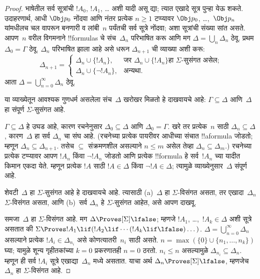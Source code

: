 \documentclass[../../../include/open-logic-section]{subfiles}
\begin{document}
\begin{proof}
भाषेतील सर्व सूत्रांची $!A_0$, $!A_1$, \dots{} अशी यादी असू द्या;
त्यात एखादे सूत्र पुन्हा येऊ शकते. उदाहरणार्थ, आधी
$\Obj p_0$ नोंदवा आणि नंतर प्रत्येक $n \ge 1$ टप्प्यावर
$\Obj p_0$, \dots,~$\Obj p_n$ यांमधीलच चल वापरून
बनणारी व लांबी~$n$ पर्यंतची सर्व सूत्रे नोंदवा;
अशा सूत्रांची संख्या सांत असते. आपण~$n$ वरील विगमनाने
!!{formula}s चे संच~$\Delta_n$ परिभाषित करू आणि मग
$\Delta = \bigcup_n \Delta_n$ ठेवू. प्रथम $\Delta_0 = \Gamma$
ठेवू. $\Delta_n$ परिभाषित झाला आहे असे धरून
$\Delta_{n+1}$ ची व्याख्या अशी करू:
\[
\Delta_{n+1} =
\begin{cases}
  \Delta_n \cup \{!A_n\}, & \text{जर $\Delta_n \cup \{ !A_n\}$
    हा $\Sigma$-सुसंगत असेल;} \\
  \Delta_n \cup \{ \lnot !A_n\}, & \text{अन्यथा.}
\end{cases}
\]
आता $\Delta = \bigcup_{n=0}^\infty \Delta_n$ ठेवू.

या व्याख्येतून आवश्यक गुणधर्म असलेला संच~$\Delta$
खरोखर मिळतो हे दाखवायचे आहे: $\Gamma \subseteq \Delta$
आणि~$\Delta$ हा संपूर्ण $\Sigma$-सुसंगत आहे.

$\Gamma \subseteq \Delta$ हे उघड आहे, कारण रचनेनुसार
$\Delta_0 \subseteq \Delta$ आणि $\Delta_0 = \Gamma$.
खरे तर प्रत्येक~$n$ साठी $\Delta_n \subseteq \Delta$,
कारण~$\Delta$ हा सर्व $\Delta_n$ चा संघ आहे. (रचनेच्या
प्रत्येक पायरीवर आधीच्या संचात !!a{formula} जोडतो; म्हणून
$\Delta_n \subseteq \Delta_{n+1}$. तसेच
$\subseteq$ संक्रमणशील असल्याने $n \le m$ असेल तेव्हा
$\Delta_n \subseteq \Delta_{m}$.) रचनेच्या प्रत्येक
टप्प्यावर आपण $!A_n$ किंवा $\lnot !A_n$ जोडतो आणि
प्रत्येक !!{formula} हे सर्व~$!A_n$ च्या यादीत किमान
एकदा येते. म्हणून प्रत्येक $!A$ साठी $!A
\in \Delta$ किंवा $\lnot !A \in \Delta$;
त्यामुळे व्याख्येनुसार~$\Delta$ संपूर्ण आहे.

शेवटी~$\Delta$ हा $\Sigma$-सुसंगत आहे हे दाखवायचे आहे.
त्यासाठी (a)~$\Delta$ हा $\Sigma$-विसंगत असता, तर
एखादा~$\Delta_n$ $\Sigma$-विसंगत असता, आणि
(b)~सर्व $\Delta_n$ हे $\Sigma$-सुसंगत आहेत,
असे आपण दाखवू.

समजा~$\Delta$ हा $\Sigma$-विसंगत आहे. मग
$\Delta \Proves[\Sigma] \lfalse$; म्हणजे
$!A_1$, \dots,~$!A_k \in \Delta$ अशी सूत्रे असतात की
$\Sigma \Proves !A_1 \lif (!A_2 \lif \cdots (!A_k
\lif \lfalse)\dots)$. $\Delta = \bigcup_{n=0}^\infty \Delta_n$
असल्याने प्रत्येक $!A_i \in \Delta_{n_i}$ असे कोणत्यातरी~$n_i$
साठी असते. $n=\max(\{0\}\cup\{n_1,\dots,n_k\})$ घ्या;
यामुळे शून्य गृहीतकांच्या $k=0$ प्रकरणातही $n=0$ ठरतो. $n_i \le n$ असल्यामुळे
$\Delta_{n_i} \subseteq \Delta_n$. म्हणून ही सर्व
$!A_i$ सूत्रे एखाद्या~$\Delta_n$ मध्ये असतात.
याचा अर्थ $\Delta_n \Proves[\Sigma] \lfalse$,
म्हणजेच~$\Delta_n$ हा $\Sigma$-विसंगत आहे.


\end{proof}
\end{document}
